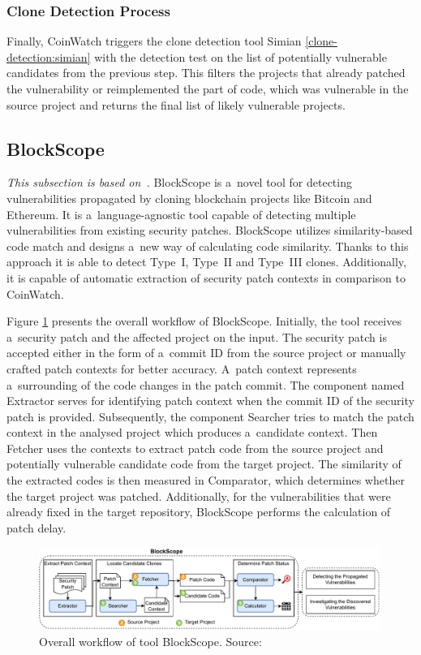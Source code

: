     \subsubsection*{Clone Detection Process}
    Finally, CoinWatch triggers the clone detection tool Simian \ref{clone-detection:simian} with the detection
    test on the list of potentially vulnerable candidates from the previous step. This filters the projects
    that already patched the vulnerability or reimplemented the part of code, which was vulnerable in the
    source project and returns the final list of likely vulnerable projects.

  \subsection*{BlockScope}
  \label{section:blockscope}
    \textit{This subsection is based on~\cite{BlockScope}.}
    BlockScope is a~novel tool for detecting vulnerabilities propagated by cloning blockchain projects like
    Bitcoin and Ethereum. It is a~language-agnostic tool capable of detecting multiple vulnerabilities from
    existing security patches. BlockScope utilizes similarity-based code match and designs
    a~new way of calculating code similarity. Thanks to this approach it is able to detect Type~I, Type~II and
    Type~III clones. Additionally, it is capable of automatic extraction of security patch contexts in comparison
    to CoinWatch.

    Figure \ref{blockscopeworkflow} presents the overall workflow of BlockScope. Initially,
    the tool receives a~security patch and the affected project on the input. The security patch is accepted
    either in the form of a~commit ID from the source project or manually crafted patch contexts for better accuracy.
    A~patch context represents a~surrounding of the code changes in the patch commit. The component named
    Extractor serves for identifying patch context when the commit ID of the security patch is provided.
    Subsequently, the component Searcher tries to match the patch context in the analysed project which produces
    a~candidate context. Then Fetcher uses the contexts to extract patch code from the source project
    and potentially vulnerable candidate code from the target project. The similarity of the extracted
    codes is then measured in Comparator, which determines whether the target project was patched. Additionally,
    for the vulnerabilities that were already fixed in the target repository, BlockScope performs
    the calculation of patch delay.
    \bigskip
    \begin{figure}[h]
      \centering
      \includegraphics[width=0.99\textwidth]{obrazky-figures/blockscope_workflow.pdf}
      \caption{Overall workflow of tool BlockScope. Source:~\cite{BlockScope}}
      \label{blockscopeworkflow}
    \end{figure}

